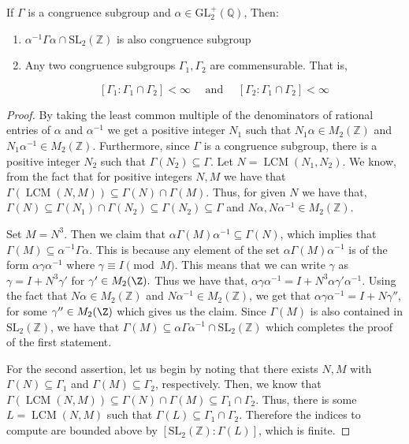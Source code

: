 \begin{proposition}
    If $\Gamma$ is a congruence subgroup and $\alpha \in \mathrm{GL}_{2}^{+}(\mathbb{Q})$, Then:
    \begin{enumerate}
        \item $\alpha^{-1} \Gamma \alpha \cap \mathrm{SL}_{2}(\mathbb{Z})$ is also congruence subgroup
        \item Any two congruence subgroups $\Gamma_{1}, \Gamma_{2}$ are commensurable. That is,


$$
\left[\Gamma_{1}: \Gamma_{1} \cap \Gamma_{2}\right]<\infty \quad \text { and } \quad\left[\Gamma_{2}: \Gamma_{1} \cap \Gamma_{2}\right]<\infty
$$
    \end{enumerate}  
\begin{proof}
      By taking the least common multiple of the denominators of rational entries of $\alpha$ and $\alpha^{-1}$ we get a positive integer $N_1$ such that $N_1 \alpha \in M_{2}(\mathbb{Z})$ and $N_1 \alpha^{-1} \in M_{2}(\mathbb{Z})$. Furthermore, since $\Gamma$ is a congruence subgroup, there is a positive integer $N_2$ such that $\Gamma(N_2) \subseteq \Gamma$. Let $N=\operatorname{LCM}(N_1, N_2)$. 
     We know, from the fact that for positive integers $N, M$ we have that $\Gamma(\operatorname{LCM}(N,M))\subseteq \Gamma(N) \cap \Gamma(M)$. Thus, for given $N$ we have that, $\Gamma(N) \subseteq \Gamma(N_1) \cap \Gamma(N_2) \subseteq \Gamma(N_2) \subseteq \Gamma$ and $ N \alpha ,N \alpha^{-1} \in M_{2}(\mathbb{Z})$.   
     
     Set $M=N^{3}$. Then we claim that $\alpha \Gamma(M) \alpha^{-1} \subseteq \Gamma(N)$, which implies that $\Gamma(M) \subseteq \alpha^{-1} \Gamma \alpha$. This is because any element of the set $\alpha \Gamma(M) \alpha^{-1}$ is of the form $\alpha\gamma\alpha^{-1}$ where $\gamma\equiv I \pmod{M}.$ This means that we can write $\gamma$ as $\gamma=I + N^3\gamma'$ for $\gamma'\in M_2(\Z).$ Thus we have that, $\alpha\gamma \alpha^{-1}=I+N^3\alpha \gamma' \alpha^{-1}$. Using the fact that $N \alpha \in M_{2}(\mathbb{Z})$ and $N \alpha^{-1} \in M_{2}(\mathbb{Z})$, we get that $\alpha\gamma \alpha^{-1}=I+ N \gamma''$, for some $\gamma''  \in M_2(\Z)$ which gives us the claim.  Since $\Gamma(M)$ is also contained in $\mathrm{SL}_{2}(\mathbb{Z})$, we have that $\Gamma(M)\subseteq \alpha \Gamma\alpha^{-1} \cap \mathrm{SL}_{2}(\mathbb{Z}) $ which completes the proof of the first statement. 

For the second assertion, let us begin by noting that there exists $N, M$ with $\Gamma(N) \subseteq \Gamma_1$ and $\Gamma(M) \subseteq \Gamma_2$, respectively. Then, we know that $\Gamma(\operatorname{LCM}(N,M))\subseteq \Gamma(N) \cap \Gamma(M) \subseteq \Gamma_{1} \cap \Gamma_{2} $. Thus,
there is some $L=\operatorname{LCM}(N,M)$ such that $\Gamma(L) \subseteq \Gamma_{1} \cap \Gamma_{2}$. Therefore the indices to compute are bounded above by $\left[\mathrm{SL}_{2}(\mathbb{Z}): \Gamma(L)\right]$, which is finite.
\end{proof}
\end{proposition}
